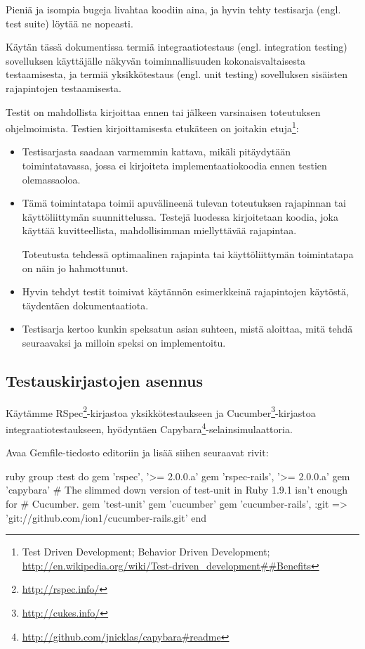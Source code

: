 \documentclass{article}
\newcommand{\pdfforeignlanguage}[2]{\texorpdfstring{\foreignlanguage{#1}{#2}}{#2}}
\newcommand{\eng}[1]{\pdfforeignlanguage{english}{#1}}
\begin{document}
Pieniä ja isompia bugeja livahtaa koodiin aina, ja hyvin tehty testisarja
(engl. \eng{test suite}) löytää ne nopeasti.

Käytän tässä dokumentissa termiä integraatiotestaus (engl. \eng{integration
testing}) sovelluksen käyttäjälle näkyvän toiminnallisuuden kokonaisvaltaisesta
testaamisesta, ja termiä yksikkötestaus (engl. \eng{unit testing}) sovelluksen
sisäisten rajapintojen testaamisesta.

Testit on mahdollista kirjoittaa ennen tai jälkeen varsinaisen toteutuksen
ohjelmoimista. Testien kirjoittamisesta etukäteen on joitakin
etuja\footnote{\eng{Test Driven Development; Behavior Driven Development;
\url{http://en.wikipedia.org/wiki/Test-driven\_development##Benefits}}}:

\begin{itemize}
\item
Testisarjasta saadaan varmemmin kattava, mikäli pitäydytään toimintatavassa,
jossa ei kirjoiteta implementaatiokoodia ennen testien olemassaoloa.

\item
Tämä toimintatapa toimii apuvälineenä tulevan toteutuksen rajapinnan tai
käyttöliittymän suunnittelussa. Testejä luodessa kirjoitetaan koodia, joka
käyttää kuvitteellista, mahdollisimman miellyttävää rajapintaa.

Toteutusta tehdessä optimaalinen rajapinta tai käyttöliittymän toimintatapa on
näin jo hahmottunut.

\item
Hyvin tehdyt testit toimivat käytännön esimerkkeinä rajapintojen käytöstä,
täydentäen dokumentaatiota.

\item
Testisarja kertoo kunkin speksatun asian suhteen, mistä aloittaa, mitä tehdä
seuraavaksi ja milloin speksi on implementoitu.
\end{itemize}

\subsection{Testauskirjastojen asennus}

Käytämme RSpec\footnote{\url{http://rspec.info/}}-kirjastoa yksikkötestaukseen
ja Cucumber\footnote{\url{http://cukes.info/}}-kirjastoa
integraatiotestaukseen, hyödyntäen
Capybara\footnote{\url{http://github.com/jnicklas/capybara\#readme}}-selainsimulaattoria.

\begin{samepage}
Avaa Gemfile-tiedosto editoriin ja lisää siihen seuraavat rivit:

\begin{pygmented}{ruby}
group :test do
  gem 'rspec', '>= 2.0.0.a'
  gem 'rspec-rails', '>= 2.0.0.a'
  gem 'capybara'
  # The slimmed down version of test-unit in Ruby 1.9.1 isn't enough for
  # Cucumber.
  gem 'test-unit'
  gem 'cucumber'
  gem 'cucumber-rails', :git => 'git://github.com/ion1/cucumber-rails.git'
end
\end{pygmented}
\end{samepage}
\end{document}
